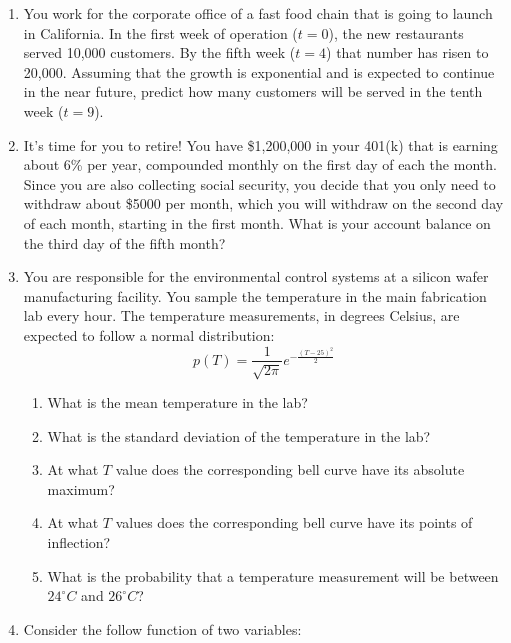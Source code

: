 \documentclass[letterpaper,12pt,fleqn]{article}
\begin{document}
\begin{enumerate}[left=0pt]

\item You work for the corporate office of a fast food chain that is going to launch in California.  In the first
  week of operation (\(t=0\)), the new restaurants served 10,000 customers.  By the fifth week (\(t=4\)) that
  number has risen to 20,000.  Assuming that the growth is exponential and is expected to continue in the near
  future, predict how many customers will be served in the tenth week (\(t=9\)).

\item It's time for you to retire!  You have \$1,200,000 in your 401(k) that is earning about 6\% per year,
  compounded monthly on the first day of each the month.  Since you are also collecting social security, you decide
  that you only need to withdraw about \$5000 per month, which you will withdraw on the second day of each month,
  starting in the first month.  What is your account balance on the third day of the fifth month?

\item You are responsible for the environmental control systems at a silicon wafer manufacturing facility.  You
  sample the temperature in the main fabrication lab every hour.  The temperature measurements, in degrees Celsius,
  are expected to follow a normal distribution:
  \[p(T)=\frac{1}{\sqrt{2\pi}}e^{-\frac{(T-25)^2}{2}}\]
  \begin{enumerate}
  \item What is the mean temperature in the lab?
  \item What is the standard deviation of the temperature in the lab?
  \item At what \(T\) value does the corresponding bell curve have its absolute maximum?
  \item At what \(T\) values does the corresponding bell curve have its points of inflection?
  \item What is the probability that a temperature measurement will be between \(24^{\circ}C\) and \(26^{\circ}C\)?
  \end{enumerate}

\item Consider the follow function of two variables:

  \bigskip

  \begin{center}
  \end{center}
  

\end{enumerate}
\end{document}
